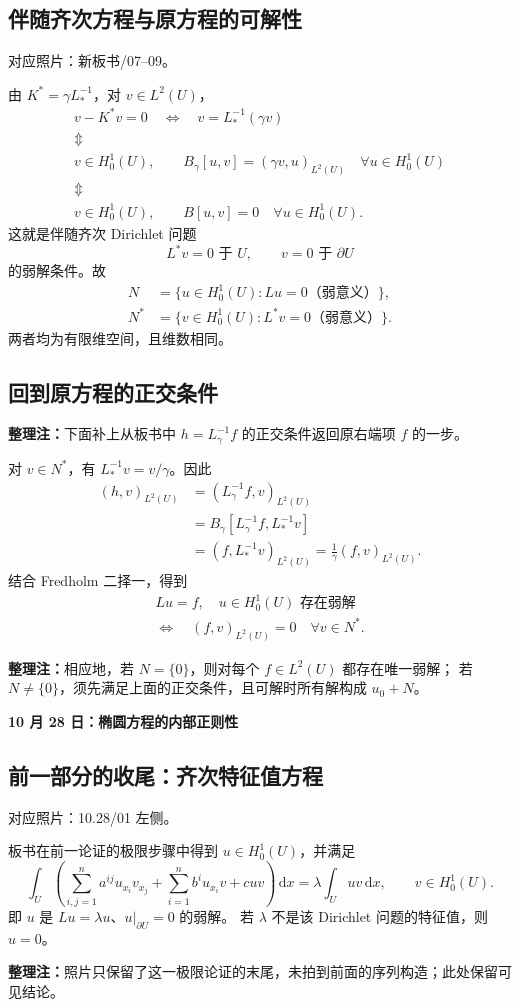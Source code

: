 \documentclass[UTF8,a4paper,11pt,fontset=fandol]{ctexart}
\newcommand{\dd}{\,\mathrm d}
\newcommand{\ednote}[1]{\par{\small\color{notegray}\textbf{整理注：}#1}\par}
\newcommand{\source}[1]{{\small\color{notegray}对应照片：#1。}\par}
\begin{document}
\subsection{伴随齐次方程与原方程的可解性}
\source{新板书/07--09}
由 $K^*=\gamma L_*^{-1}$，对 $v\in L^2(U)$，
\[
\begin{gathered}
v-K^*v=0\quad\Longleftrightarrow\quad v=L_*^{-1}(\gamma v)\\
\Updownarrow\\
v\in H_0^1(U),\qquad
B_\gamma[u,v]=(\gamma v,u)_{L^2(U)}\quad\forall u\in H_0^1(U)\\
\Updownarrow\\
v\in H_0^1(U),\qquad B[u,v]=0\quad\forall u\in H_0^1(U).
\end{gathered}
\]
这就是伴随齐次 Dirichlet 问题
\[
L^*v=0\text{ 于 }U,\qquad v=0\text{ 于 }\partial U
\]
的弱解条件。故
\[
\begin{aligned}
N&=\{u\in H_0^1(U):Lu=0\text{（弱意义）}\},\\
N^*&=\{v\in H_0^1(U):L^*v=0\text{（弱意义）}\}.
\end{aligned}
\]
两者均为有限维空间，且维数相同。

\subsection*{回到原方程的正交条件}
\ednote{下面补上从板书中 $h=L_\gamma^{-1}f$ 的正交条件返回原右端项 $f$ 的一步。}
对 $v\in N^*$，有 $L_*^{-1}v=v/\gamma$。因此
\[
\begin{aligned}
(h,v)_{L^2(U)}
&=(L_\gamma^{-1}f,v)_{L^2(U)}\\
&=B_\gamma[L_\gamma^{-1}f,L_*^{-1}v]\\
&=(f,L_*^{-1}v)_{L^2(U)}
=\frac1\gamma(f,v)_{L^2(U)}.
\end{aligned}
\]
结合 Fredholm 二择一，得到
\[
\boxed{\begin{gathered}
Lu=f,\quad u\in H_0^1(U)\text{ 存在弱解}\\
\Longleftrightarrow\quad
(f,v)_{L^2(U)}=0\quad\forall v\in N^*.
\end{gathered}}
\]
\ednote{相应地，若 $N=\{0\}$，则对每个 $f\in L^2(U)$ 都存在唯一弱解；
若 $N\ne\{0\}$，须先满足上面的正交条件，且可解时所有解构成 $u_0+N$。}

\newpage
{}
\begin{center}
  {\Large\bfseries 10 月 28 日：椭圆方程的内部正则性}
\end{center}
\subsection*{前一部分的收尾：齐次特征值方程}
\source{10.28/01 左侧}
板书在前一论证的极限步骤中得到 $u\in H_0^1(U)$，并满足
\[
\int_U\left(\sum_{i,j=1}^n a^{ij}u_{x_i}v_{x_j}
  +\sum_{i=1}^n b^iu_{x_i}v+cuv\right)\dd x
  =\lambda\int_U uv\dd x,
\qquad v\in H_0^1(U).
\]
即 $u$ 是 $Lu=\lambda u$、$u|_{\partial U}=0$ 的弱解。
若 $\lambda$ 不是该 Dirichlet 问题的特征值，则 $u=0$。
\ednote{照片只保留了这一极限论证的末尾，未拍到前面的序列构造；此处保留可见结论。}
\end{document}
